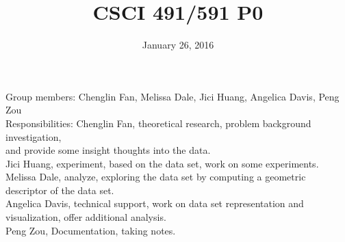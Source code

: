\documentclass[12pt]{article}
\begin{document}
	
	\title{CSCI 491/591 P0\vspace{-5ex}}
	\date{January 26, 2016}
	\maketitle
	\maketitle
	\pagestyle{empty}
	\thispagestyle{empty}
	
	Group members: Chenglin Fan, Melissa Dale, Jici Huang,
	Angelica Davis, Peng Zou\\
	
	Responsibilities: Chenglin Fan, theoretical research, problem background investigation,\\ 
	\indent \indent \indent \indent \indent \indent and  provide some insight thoughts into the data.  \\
	\indent \indent \indent \indent \indent \indent Jici Huang, experiment, based on the data set, work on some experiments.\\
	\indent \indent \indent \indent \indent \indent Melissa Dale, analyze, exploring the data set by computing a geometric\\ \indent \indent \indent \indent \indent \indent descriptor of the data set.\\
	\indent \indent \indent \indent \indent \indent Angelica Davis, technical support, work on data set representation and\\ \indent \indent \indent \indent \indent \indent visualization, offer additional analysis.\\
	\indent \indent \indent \indent \indent \indent Peng Zou, Documentation, taking notes.
	
	
\end{document}
